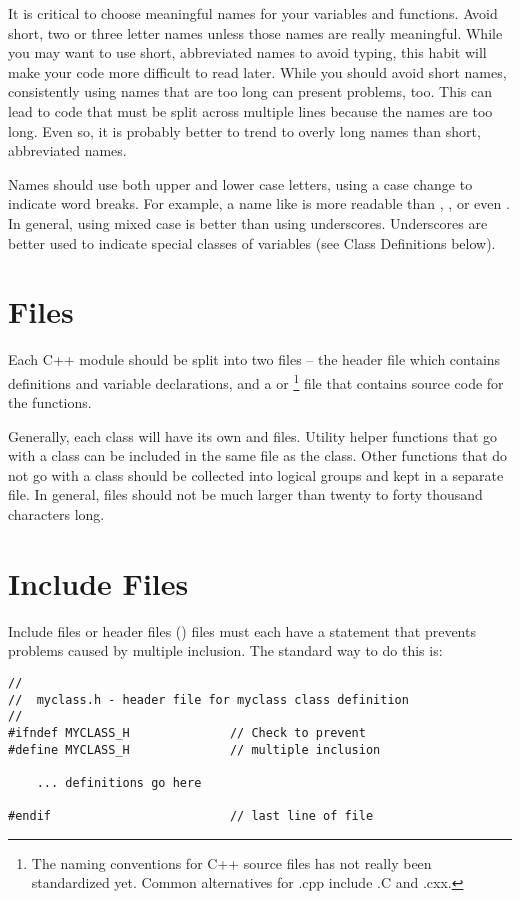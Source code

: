 It is critical to choose meaningful names for your variables and
functions. Avoid short, two or three letter names unless those
names are really meaningful. While you may want to use short,
abbreviated names to avoid typing, this habit will make your
code more difficult to read later. While you should avoid
short names, consistently using names that are too long can
present problems, too. This can lead to code that must be
split across multiple lines because the names are too long.
Even so, it is probably better to trend to overly long names
than short, abbreviated names.

Names should use both upper and lower case letters, using
a case change to indicate word breaks. For example, a name
like  is more readable than ,
, or even . In general,
using mixed case is better than using underscores. Underscores are
better used to indicate special classes of variables (see Class
Definitions below).

\section{Files}

Each C++ module should be split into two files -- the  header
file which contains  definitions and variable declarations,
and a  or \footnote{The naming conventions for
C++ source files has not really been standardized yet. Common
alternatives for .cpp include .C and .cxx.} file that contains
source code for the functions.

Generally, each class will have its own  and 
files. Utility helper functions that go with a class can be included
in the same file as the class. Other functions that do not go with
a class should be collected into logical groups and kept in 
a separate file. In general, files should not be much larger than
twenty to forty thousand characters long.

\section{Include Files}

Include files or header files () files must each have
a  statement that prevents problems caused by
multiple inclusion. The standard way to do this is:

\begin{verbatim}
//
//  myclass.h - header file for myclass class definition
//
#ifndef MYCLASS_H              // Check to prevent
#define MYCLASS_H              // multiple inclusion

    ... definitions go here

#endif                         // last line of file
\end{verbatim}

